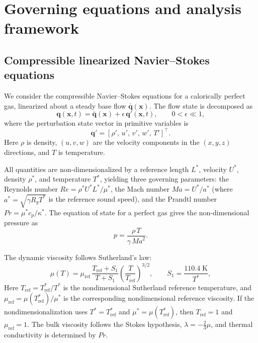 \documentclass[11pt]{article}
\newcommand{\Rey}{\mathit{Re}}
\newcommand{\Ma}{\mathit{Ma}}
\renewcommand{\Pr}{\mathit{Pr}}
\newcommand{\bq}{\mathbf{q}}
\newcommand{\bqp}{\mathbf{q}'}
\newcommand{\bqbar}{\bar{\mathbf{q}}}
\newcommand{\bx}{\mathbf{x}}
\begin{document}
\section{Governing equations and analysis framework}
\label{sec:equations}

\subsection{Compressible linearized Navier--Stokes equations}
\label{sec:lnse}

We consider the compressible Navier--Stokes equations for a calorically perfect gas, linearized about a steady base flow $\bqbar(\bx)$.
The flow state is decomposed as
\begin{equation}
  \bq(\bx,t) = \bqbar(\bx) + \epsilon\,\bqp(\bx,t),
  \qquad 0 < \epsilon \ll 1,
\end{equation}
where the perturbation state vector in primitive variables is
\begin{equation}
  \bqp = [\rho',\, u',\, v',\, w',\, T']^\top.
  \label{eq:state_vector}
\end{equation}
Here $\rho$ is density, $(u,v,w)$ are the velocity components in the $(x,y,z)$ directions, and $T$ is temperature.

All quantities are non-dimensionalized by a reference length $L^*$, velocity $U^*$, density $\rho^*$, and temperature $T^*$, yielding three governing parameters: the Reynolds number $\Rey = \rho^* U^* L^* / \mu^*$, the Mach number $\Ma = U^* / a^*$ (where $a^* = \sqrt{\gamma R_g T^*}$ is the reference sound speed), and the Prandtl number $\Pr = \mu^* c_p / \kappa^*$.
The equation of state for a perfect gas gives the non-dimensional pressure as
\begin{equation}
  p = \frac{\rho\, T}{\gamma\, \Ma^2}.
  \label{eq:eos}
\end{equation}

The dynamic viscosity follows Sutherland's law:
\begin{equation}
  \mu(T) = \mu_{\mathrm{ref}}\,
  \frac{T_{\mathrm{ref}} + S_1}{T + S_1}
  \left(\frac{T}{T_{\mathrm{ref}}}\right)^{3/2},
  \qquad S_1 = \frac{110.4\;\mathrm{K}}{T^*},
  \label{eq:sutherland}
\end{equation}
Here $T_{\mathrm{ref}}=T_{\mathrm{ref}}^*/T^*$ is the nondimensional Sutherland reference temperature, and $\mu_{\mathrm{ref}}=\mu(T_{\mathrm{ref}}^*)/\mu^*$ is the corresponding nondimensional reference viscosity. If the nondimensionalization uses $T^*=T_{\mathrm{ref}}^*$ and $\mu^*=\mu(T_{\mathrm{ref}}^*)$, then $T_{\mathrm{ref}}=1$ and $\mu_{\mathrm{ref}}=1$.
The bulk viscosity follows the Stokes hypothesis, $\lambda = -\tfrac{2}{3}\mu$, and thermal conductivity is determined by $\Pr$.
\end{document}
